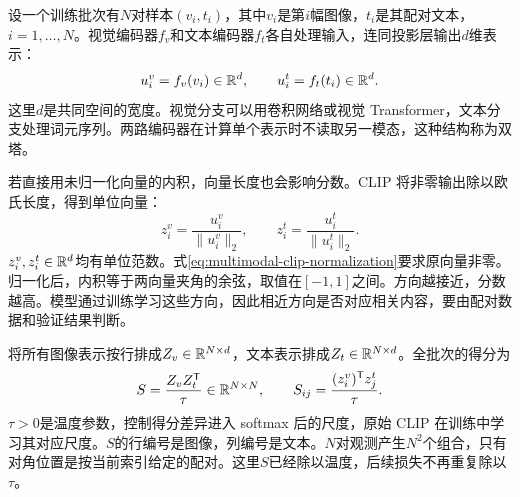 设一个训练批次有$N$对样本$(v_i,t_i)$，其中$v_i$是第$i$幅图像，$t_i$是其配对文本，$i=1,\ldots,N$。视觉编码器$f_v$和文本编码器$f_t$各自处理输入，连同投影层输出$d$维表示：
\begin{equation}
 u_i^v=f_v(v_i)\in\mathbb{R}^d,\qquad
 u_i^t=f_t(t_i)\in\mathbb{R}^d.
\end{equation}
这里$d$是共同空间的宽度。视觉分支可以用卷积网络或视觉 Transformer，文本分支处理词元序列。两路编码器在计算单个表示时不读取另一模态，这种结构称为双塔。

若直接用未归一化向量的内积，向量长度也会影响分数。CLIP 将非零输出除以欧氏长度，得到单位向量：
\begin{equation}
 z_i^v=\frac{u_i^v}{\|u_i^v\|_2},\qquad
 z_i^t=\frac{u_i^t}{\|u_i^t\|_2}.
 \label{eq:multimodal-clip-normalization}
\end{equation}
$z_i^v,z_i^t\in\mathbb{R}^d$均有单位范数。式\eqref{eq:multimodal-clip-normalization}要求原向量非零。归一化后，内积等于两向量夹角的余弦，取值在$[-1,1]$之间。方向越接近，分数越高。模型通过训练学习这些方向，因此相近方向是否对应相关内容，要由配对数据和验证结果判断。

将所有图像表示按行排成$Z_v\in\mathbb{R}^{N\times d}$，文本表示排成$Z_t\in\mathbb{R}^{N\times d}$。全批次的得分为
\begin{equation}
 S=\frac{Z_vZ_t^{\mathsf T}}{\tau}\in\mathbb{R}^{N\times N},\qquad
 S_{ij}=\frac{(z_i^v)^{\mathsf T}z_j^t}{\tau}.
 \label{eq:multimodal-clip-scores}
\end{equation}
$\tau>0$是温度参数，控制得分差异进入 softmax 后的尺度，原始 CLIP 在训练中学习其对应尺度。$S$的行编号是图像，列编号是文本。$N$对观测产生$N^2$个组合，只有对角位置是按当前索引给定的配对。这里$S$已经除以温度，后续损失不再重复除以$\tau$。

